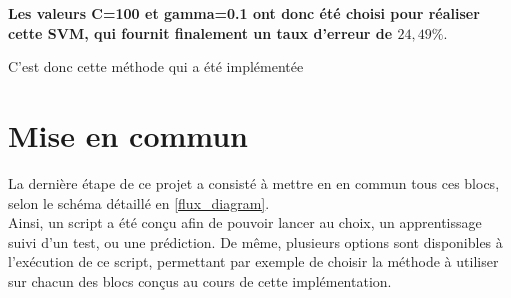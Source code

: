 \textbf{Les valeurs C=100 et gamma=0.1 ont donc été choisi pour réaliser cette SVM, qui fournit finalement un taux d'erreur de $24,49\%$}.

C'est donc cette méthode qui a été implémentée


\section{Mise en commun}
\par La dernière étape de ce projet a consisté à mettre en en commun tous ces blocs, selon le schéma détaillé en \ref{flux_diagram}.\\
Ainsi, un script a été conçu afin de pouvoir lancer au choix, un apprentissage suivi d'un test, ou une prédiction. De même, plusieurs options sont disponibles à l'exécution de ce script, permettant par exemple de choisir la méthode à utiliser sur chacun des blocs conçus au cours de cette implémentation.
